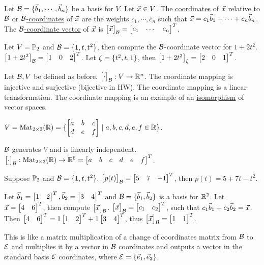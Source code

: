 \documentclass[10pt,a4paper]{article}
\begin{document}
\begin{definition}
	Let $\mathcal{B} = \{\vec{b}_1,\cdots,\vec{b}_n\}$ be a basis for $V$. Let $\vec{x} \in V$. The \underline{coordinates} of $\vec{x}$ relative to $\mathcal{B}$ or \underline{$\mathcal{B}$-coordinates} of $\vec{x}$ are the weights $c_1,\cdots,c_n$ such that $\vec{x} = c_1 \vec{b}_1 + \cdots + c_n \vec{b}_n$. The \underline{$\mathcal{B}$-coordinate vector} of $\vec{x}$ is $\begin{bmatrix}\vec{x}\end{bmatrix}_{\mathcal{B}} = \begin{bmatrix}c_1&\cdots&c_n\end{bmatrix}^T$.
\end{definition}

\begin{example}
	Let $V = \mathbb{P}_2$ and $\mathcal{B} = \{1,t,t^2\}$, then compute the $\mathcal{B}$-coordinate vector for $1+2t^2$. $\begin{bmatrix}1+2t^2\end{bmatrix}_{\mathcal{B}} = \begin{bmatrix}1&0&2\end{bmatrix}^T$. Let $\mathcal{\zeta} = \{t^2,t,1\}$, then $\begin{bmatrix}1+2t^2\end{bmatrix}_{\mathcal{\zeta}} = \begin{bmatrix}2&0&1\end{bmatrix}^T$.
\end{example}

\begin{definition}
	Let $\mathcal{B},V$ be defined as before. $\begin{bmatrix}\cdot\end{bmatrix}_{\mathcal{B}} : V \rightarrow \mathbb{R}^n$. The coordinate mapping is injective and surjective (bijective in HW). The coordinate mapping is a linear transformation. The coordinate mapping is an example of an \underline{isomorphism} of vector spaces.
\end{definition}

\begin{example}
	$V = \text{Mat}_{2\times 3} ( \mathbb{R}) = \{\begin{bmatrix}a&b&c\\d&e&f\end{bmatrix} \mid a,b,c,d,e,f\in\mathbb{R}\}$.
\end{example}
\begin{note}
	$\mathcal{B}$ generates $V$ and is linearly independent. %
	$\begin{bmatrix}\cdot\end{bmatrix}_{\mathcal{B}} : \text{Mat}_{2\times 3} (\mathbb{R}) \rightarrow \mathbb{R}^6 = \begin{bmatrix}a&b&c&d&e&f\end{bmatrix}^T$.
\end{note}
\begin{example}
	Suppose $\mathbb{P}_2$ and $ \mathcal{B} = \{1,t,t^2\}$. $\begin{bmatrix}p(t)\end{bmatrix}_{\mathcal{B}} = \begin{bmatrix}5&7&-1\end{bmatrix}^T$, then $p(t) = 5+7t-t^2$.
\end{example}
\begin{example}
	Let $\vec{b}_1 = \begin{bmatrix}1&2\end{bmatrix}^T,\vec{b}_2 = \begin{bmatrix}3&4\end{bmatrix}^T$ and $\mathcal{B} = \{\vec{b}_1,\vec{b}_2\}$ is a basis for $\mathbb{R}^2$. Let $\vec{x} = \begin{bmatrix}4&6\end{bmatrix}^T$, then compute $\begin{bmatrix}\vec{x}\end{bmatrix}_{\mathcal{B}}$.
		$\begin{bmatrix}\vec{x}\end{bmatrix}_{\mathcal{B}} = \begin{bmatrix}c_1&c_2\end{bmatrix}^T$, such that $c_1 \vec{b}_1 + c_2 \vec{b}_2 = \vec{x}$. Then $\begin{bmatrix}4&6\end{bmatrix}^T = 1 \begin{bmatrix}1&2\end{bmatrix}^T + 1 \begin{bmatrix}3&4\end{bmatrix}^T$, thus $\begin{bmatrix}\vec{x}\end{bmatrix}_{\mathcal{B}} = \begin{bmatrix}1&1\end{bmatrix}^T$.
\end{example}
\begin{note}
	This is like a matrix multiplication of a change of coordinates matrix from $\mathcal{B}$ to $\mathcal{E}$ and multiplies it by a vector in $\mathcal{B}$ coordinates and outputs a vector in the standard basis $\mathcal{E}$ coordinates, where $\mathcal{E} = \{\vec{e}_1,\vec{e}_2\}$.
\end{note}
\end{document}
